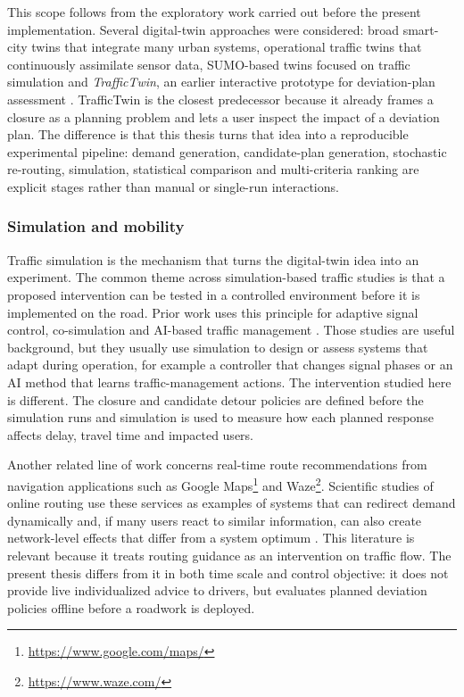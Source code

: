 This scope follows from the exploratory work carried out before the present implementation. Several
digital-twin approaches were considered: broad smart-city twins that integrate many urban systems,
operational traffic twins that continuously assimilate sensor data, SUMO-based twins focused on
traffic simulation and \textit{TrafficTwin}, an earlier interactive prototype for deviation-plan
assessment \cite{smart_city,digital_twin_transport,sumo_twin,SIM_param}. TrafficTwin is the closest
predecessor because it already frames a closure as a planning problem and lets a user inspect the
impact of a deviation plan. The difference is that this thesis turns that idea into a reproducible
experimental pipeline: demand generation, candidate-plan generation, stochastic re-routing,
simulation, statistical comparison and multi-criteria ranking are explicit stages rather than
manual or single-run interactions.

\subsubsection{Simulation and mobility}

Traffic simulation is the mechanism that turns the digital-twin idea into an experiment. The common
theme across simulation-based traffic studies is that a proposed intervention can be tested in a
controlled environment before it is implemented on the road. Prior work uses this principle for
adaptive signal control, co-simulation and AI-based traffic management
\cite{ai_driven_simulation,cosimulation,traffic_light_simulation}. Those studies are useful
background, but they usually use simulation to design or assess systems that adapt during
operation, for example a controller that changes signal phases or an AI method that learns traffic-management actions.
The intervention studied here is different. The closure and candidate detour policies are defined
before the simulation runs and simulation is used to measure how each planned response affects
delay, travel time and impacted users.

Another related line of work concerns real-time route recommendations from navigation applications
such as Google Maps\footnote{\url{https://www.google.com/maps/}} and Waze\footnote{\url{https://www.waze.com/}}. 
Scientific studies of online routing use these services as examples
of systems that can redirect demand dynamically and, if many users react to similar information, can
also create network-level effects that differ from a system optimum
\cite{jalota_online_routing_2021,toso_route_recommendations_2023}. This literature is relevant
because it treats routing guidance as an intervention on traffic flow. The present thesis differs
from it in both time scale and control objective: it does not provide live individualized advice to
drivers, but evaluates planned deviation policies offline before a roadwork is deployed.

